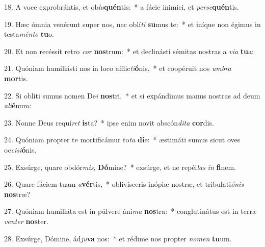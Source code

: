 18. A voce exprobrántis, et ob\textit{lo}\textbf{quén}tis:~*  a fácie inimíci, et \textit{per}\textit{se}\textbf{quén}tis.\

19. Hæc ómnia venérunt super nos, nec oblí\textit{ti} \textbf{su}mus te:~*  et iníque non égimus in testa\textit{mén}\textit{to} \textbf{tu}o.\

20. Et non recéssit retro \textit{cor} \textbf{nos}trum:~*  et declinásti sémitas nostras a \textit{vi}\textit{a} \textbf{tu}a:\

21. Quóniam humiliásti nos in loco afflic\textit{ti}\textbf{ó}nis,~*  et coopéruit nos \textit{um}\textit{bra} \textbf{mor}tis.\

22. Si oblíti sumus nomen De\textit{i} \textbf{nos}tri,~*  et si expándimus manus nostras ad deum \textit{a}\textit{li}\textbf{é}num:\

23. Nonne Deus requí\textit{ret} \textbf{is}ta?~*  ipse enim novit abscón\textit{di}\textit{ta} \textbf{cor}dis.\

24. Quóniam propter te mortificámur to\textit{ta} \textbf{di}e:~*  æstimáti sumus sicut oves oc\textit{ci}\textit{si}\textbf{ó}nis.\

25. Exsúrge, quare obdór\textit{mis}, \textbf{Dó}mine?~*  exsúrge, et ne repél\textit{las} \textit{in} \textbf{fi}nem.\

26. Quare fáciem tuam \textit{a}\textbf{vér}tis,~*  oblivísceris inópiæ nostræ, et tribulati\textit{ó}\textit{nis} \textbf{nos}træ?\

27. Quóniam humiliáta est in púlvere áni\textit{ma} \textbf{nos}tra:~*  conglutinátus est in terra \textit{ven}\textit{ter} \textbf{nos}ter.\

28. Exsúrge, Dómine, ád\textit{ju}\textbf{va} nos:~*  et rédime nos propter \textit{no}\textit{men} \textbf{tu}um.\

